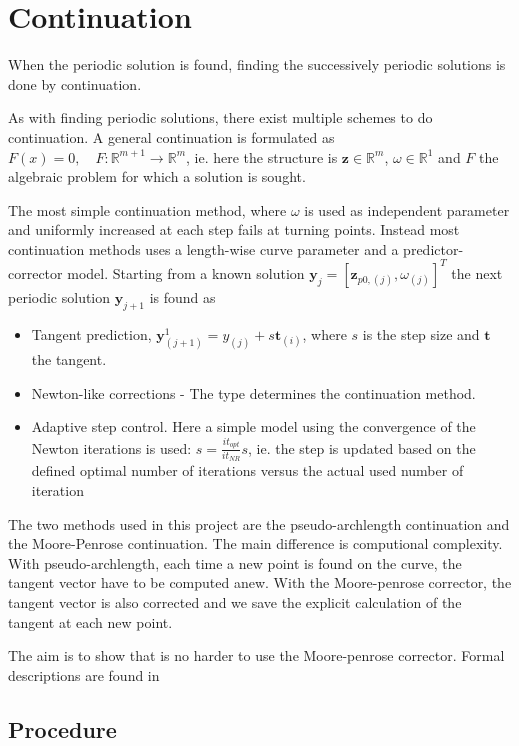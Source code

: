 

\section{Continuation}
\label{sec:continuation}

When the periodic solution is found, finding the successively periodic solutions
is done by continuation.

As with finding periodic solutions, there exist multiple schemes to do
continuation. A general continuation is formulated as $F(x)=0, \quad
F:\mathbb{R}^{m+1} \to \mathbb{R}^{m} $, ie. here the structure is $\bm z \in
\mathbb{R}^m$, $\omega \in \mathbb{R}^1$ and $F$ the algebraic problem for which
a solution is sought.

The most simple continuation method, where $\omega$ is used as independent
parameter and uniformly increased at each step fails at turning points. Instead
most continuation methods uses a length-wise curve parameter and a
predictor-corrector model. Starting from a known solution $\bm y_j = [\bm
z_{p0,(j)},\omega_{(j)}]^T$ the next periodic solution $\bm y_{j+1}$ is found as

\begin{itemize}
\item Tangent prediction, $\bm y_{(j+1)}^{1} = y_{(j)}+s\bm t_{(i)}$, where $s$
  is the step size and $\bm t$ the tangent.
\item Newton-like corrections - The type determines the continuation method.
\item Adaptive step control. Here a simple model using the convergence of the
  Newton iterations is used: $s = \frac{it_{opt}}{it_{NR}} s$, ie. the step is
  updated based on the defined optimal number of iterations versus the actual
  used number of iteration
\end{itemize}

The two methods used in this project are the pseudo-archlength continuation and
the Moore-Penrose continuation. The main difference is computional complexity.
With pseudo-archlength, each time a new point is found on the curve, the tangent
vector have to be computed anew. With the Moore-penrose corrector, the tangent
vector is also corrected and we save the explicit calculation of the tangent at
each new point.

The aim is to show that is no harder to use the Moore-penrose corrector. Formal
descriptions are found in \autocite{dhooge2003a}

\subsection{Procedure}
\label{sec:cont_procedure}

